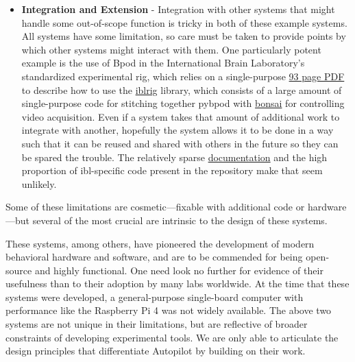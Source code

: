 \begin{itemize}[resume*, before=\vspace{0pt}, after=\vspace{\baselineskip}]
    \item \textbf{Integration and Extension} - Integration with other systems that might handle some out-of-scope function is tricky in both of these example systems. All systems have some limitation, so care must be taken to provide points by which other systems might interact with them. One particularly potent example is the use of Bpod in the International Brain Laboratory's standardized experimental rig\citep{laboratoryStandardizedReproducibleMeasurement2020b}, which relies on a single-purpose \href{https://figshare.com/articles/preprint/A_standardized_and_reproducible_method_to_measure_decision-making_in_mice_Appendix_3_IBL_protocol_for_setting_up_the_behavioral_training_rig/11634732}{93 page PDF} to describe how to use the \href{https://github.com/int-brain-lab/iblrig}{iblrig} library, which consists of a large amount of single-purpose code for stitching together pybpod with \href{https://github.com/int-brain-lab/iblrig/blob/18569278fc2d8cd3266adb2a5f660a43f8f2582e/iblrig/bonsai.py}{bonsai} for controlling video acquisition. Even if a system takes that amount of additional work to integrate with another, hopefully the system allows it to be done in a way such that it can be reused and shared with others in the future so they can be spared the trouble. The relatively sparse \href{https://iblrig.readthedocs.io/en/latest/index.html}{documentation} and the high proportion of ibl-specific code present in the repository make that seem unlikely.
\end{itemize}

Some of these limitations are cosmetic---fixable with additional code or hardware---but several of the most crucial are intrinsic to the design of these systems.

These systems, among others, have pioneered the development of modern behavioral hardware and software, and are to be commended for being open-source and highly functional. One need look no further for evidence of their usefulness than to their adoption by many labs worldwide. At the time that these systems were developed, a general-purpose single-board computer with performance like the Raspberry Pi 4 was not widely available. The above two systems are not unique in their limitations, but are reflective of broader constraints of developing experimental tools. We are only able to articulate the design principles that differentiate Autopilot by building on their work. 

